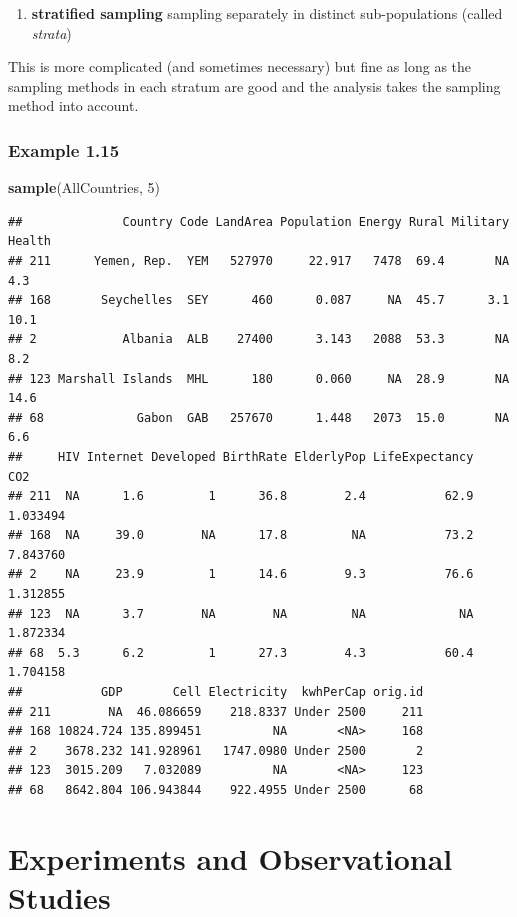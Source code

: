 \documentclass[]{book}
\newenvironment{Shaded}{\begin{snugshade}}{\end{snugshade}}
\newcommand{\DecValTok}[1]{\textcolor[rgb]{0.00,0.00,0.81}{#1}}
\newcommand{\KeywordTok}[1]{\textcolor[rgb]{0.13,0.29,0.53}{\textbf{#1}}}
\newcommand{\NormalTok}[1]{#1}
\providecommand{\tightlist}{%
  \setlength{\itemsep}{0pt}\setlength{\parskip}{0pt}}
\begin{document}
\begin{enumerate}
\tightlist
\item
  \textbf{stratified sampling} sampling separately in distinct sub-populations (called \emph{strata})
\end{enumerate}

This is more complicated (and sometimes necessary) but fine as long as the sampling methods in each stratum are good and the analysis takes the sampling method into account.

\hypertarget{example-1.15}{%
\subsubsection{Example 1.15}\label{example-1.15}}

\begin{Shaded}
\begin{Highlighting}[]
\KeywordTok{sample}\NormalTok{(AllCountries, }\DecValTok{5}\NormalTok{)}
\end{Highlighting}
\end{Shaded}

\begin{verbatim}
##              Country Code LandArea Population Energy Rural Military Health
## 211      Yemen, Rep.  YEM   527970     22.917   7478  69.4       NA    4.3
## 168       Seychelles  SEY      460      0.087     NA  45.7      3.1   10.1
## 2            Albania  ALB    27400      3.143   2088  53.3       NA    8.2
## 123 Marshall Islands  MHL      180      0.060     NA  28.9       NA   14.6
## 68             Gabon  GAB   257670      1.448   2073  15.0       NA    6.6
##     HIV Internet Developed BirthRate ElderlyPop LifeExpectancy      CO2
## 211  NA      1.6         1      36.8        2.4           62.9 1.033494
## 168  NA     39.0        NA      17.8         NA           73.2 7.843760
## 2    NA     23.9         1      14.6        9.3           76.6 1.312855
## 123  NA      3.7        NA        NA         NA             NA 1.872334
## 68  5.3      6.2         1      27.3        4.3           60.4 1.704158
##           GDP       Cell Electricity  kwhPerCap orig.id
## 211        NA  46.086659    218.8337 Under 2500     211
## 168 10824.724 135.899451          NA       <NA>     168
## 2    3678.232 141.928961   1747.0980 Under 2500       2
## 123  3015.209   7.032089          NA       <NA>     123
## 68   8642.804 106.943844    922.4955 Under 2500      68
\end{verbatim}

\hypertarget{experiments-and-observational-studies}{%
\section{Experiments and Observational Studies}\label{experiments-and-observational-studies}}
\end{document}
